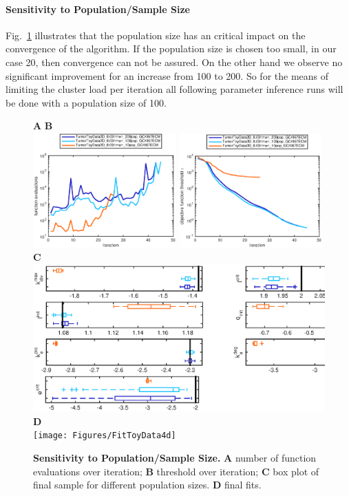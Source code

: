 \documentclass[10pt,letterpaper]{article}
\begin{document}
\paragraph{Sensitivity to Population/Sample Size}
Fig.~\ref{fig4} illustrates that the population size has an critical impact on the convergence of the algorithm. If the population size is chosen too small, in our case 20, then convergence can not be assured. On the other hand we observe no significant improvement for an increase from 100 to 200. So for the means of limiting the cluster load per iteration all following parameter inference runs will be done with a population size of 100.

\begin{figure}[htbp]
\textbf{A} \hspace{180pt} \textbf{B} \\
\includegraphics[width=0.49\textwidth]{Figures/FitToyData4a}
\includegraphics[width=0.49\textwidth]{Figures/FitToyData4b}\\
 \textbf{C} \\
\includegraphics[width=\textwidth]{Figures/FitToyData4c}\\
 \textbf{D} \\
\texttt{[image: Figures/FitToyData4d]}\\
\caption{{\bf Sensitivity to Population/Sample Size.}
\textbf{A}  number of function evaluations over iteration; \textbf{B} threshold over iteration; \textbf{C} box plot of final sample for different population sizes. \textbf{D} final fits.}
\label{fig4}
\end{figure}
\end{document}
